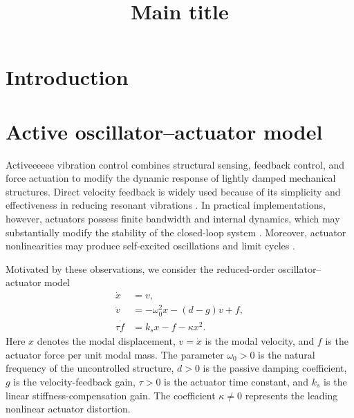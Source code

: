 \documentclass[11pt,reqno]{amsart}
\title[title]{Main title}
\theoremstyle{plain}
\theoremstyle{definition}
\theoremstyle{remark}
\begin{document}
\begin{abstract}

\end{abstract}


\maketitle


\section{Introduction}

\section{Active oscillator--actuator model}
\label{sec:active-oscillator-actuator}

Activeeeeee vibration control combines structural sensing, feedback control,
and force actuation to modify the dynamic response of lightly damped
mechanical structures. Direct velocity feedback is widely used because of
its simplicity and effectiveness in reducing resonant vibrations
\cite{balas1979direct,preumont2002vibration,hirschfeldt2025compensated}.
In practical implementations, however, actuators possess finite bandwidth
and internal dynamics, which may substantially modify the stability of the
closed-loop system \cite{goh1985stability}. Moreover, actuator nonlinearities
may produce self-excited oscillations and limit cycles
\cite{dal2020active}.

Motivated by these observations, we consider the reduced-order
oscillator--actuator model
\begin{equation}
\label{eq:model}
\begin{aligned}
\dot x
&=
v,
\\
\dot v
&=
-\omega_0^2x-(d-g)v+f,
\\
\tau\dot f
&=
k_sx-f-\kappa x^2.
\end{aligned}
\end{equation}
Here \(x\) denotes the modal displacement, \(v=\dot x\) is the modal
velocity, and \(f\) is the actuator force per unit modal mass. The
parameter \(\omega_0>0\) is the natural frequency of the uncontrolled
structure, \(d>0\) is the passive damping coefficient, \(g\) is the
velocity-feedback gain, \(\tau>0\) is the actuator time constant, and
\(k_s\) is the linear stiffness-compensation gain. The coefficient
\(\kappa\neq0\) represents the leading nonlinear actuator distortion.
\end{document}

